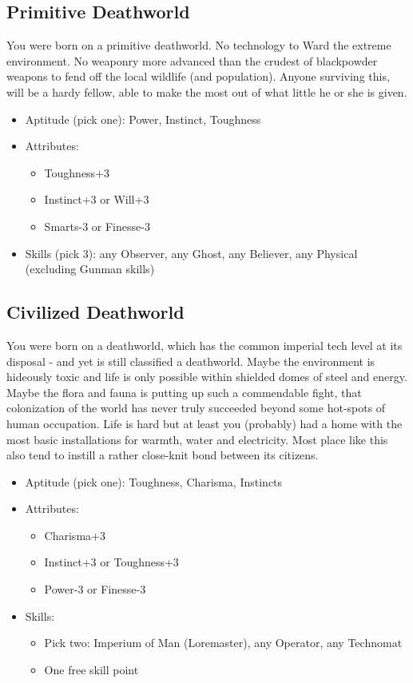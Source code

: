 	\subsection{Primitive Deathworld}
	You were born on a primitive deathworld. No technology to Ward the extreme environment. No weaponry more advanced than the crudest of blackpowder weapons to fend off the local wildlife (and population). Anyone surviving this, will be a hardy fellow, able to make the most out of what little he or she is given.

	\begin{itemize}
		\item Aptitude (pick one): Power, Instinct, Toughness
		\item Attributes: 
		\begin{itemize}
			\item Toughness+3
			\item Instinct+3 or Will+3
			\item Smarts-3 or Finesse-3
		\end{itemize}
		\item Skills (pick 3): any Observer, any Ghost, any Believer, any Physical (excluding Gunman skills)
	\end{itemize}

	\subsection{Civilized Deathworld}
	You were born on a deathworld, which has the common imperial tech level at its disposal - and yet is still classified a deathworld. Maybe the environment is hideously toxic and life is only possible within shielded domes of steel and energy. Maybe the flora and fauna is putting up such a commendable fight, that colonization of the world has never truly succeeded beyond some hot-spots of human occupation. Life is hard but at least you (probably) had a home with the most basic installations for warmth, water and electricity. Most place like this also tend to instill a rather close-knit bond between its citizens. 

	\begin{itemize}
		\item Aptitude (pick one): Toughness, Charisma, Instincts
		\item Attributes:
		\begin{itemize}
			\item Charisma+3
			\item Instinct+3 or Toughness+3
			\item Power-3 or Finesse-3
		\end{itemize}
		\item Skills: 
		\begin{itemize}
		 	\item Pick two: Imperium of Man (Loremaster), any Operator, any Technomat
		 	\item One free skill point
		 \end{itemize} 
	\end{itemize}

